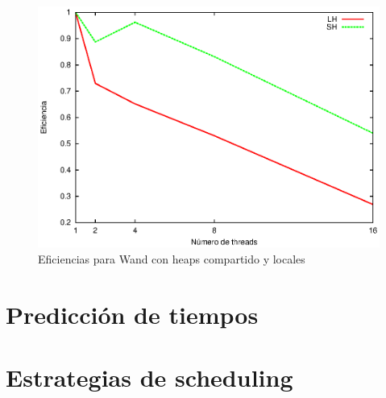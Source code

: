 \begin{figure}[!ht]
\centering
\includegraphics[scale=.75]{images/eficiencias_wand.eps}
\caption{Eficiencias para Wand con heaps compartido y locales}
\label{fig:eficiencias_wand}
\end{figure}

\section{Predicción de tiempos}
\label{evaluacionexperimental:predicciontiempos}


\section{Estrategias de scheduling}
\label{evaluacionexperimental:estrategiasscheduling}